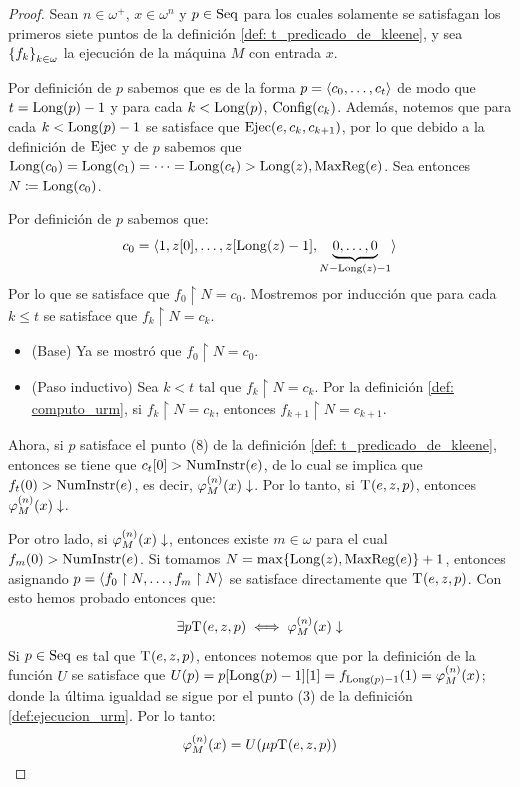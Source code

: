 \begin{proof}
	Sean $n\in\omega^{+}$, $x\in\omega^{n}$ y $p\in\SECUENCIAS$ para los cuales solamente se satisfagan los primeros siete puntos de la definición \ref{def: t_predicado_de_kleene}, y sea $\set*{f_{k}}_{k\in\omega}$ la ejecución de la máquina $M$ con entrada $x$.

	Por definición de $p$ sabemos que es de la forma $p =\inner*{c_{0},\dotsc, c_{t}}$ de modo que $t =\LONGITUD\pa*{p} - 1$ y para cada $k <\LONGITUD\pa*{p}$, $\CONFIGURACIONES\pa*{c_{k}}$. Además, notemos que para cada $k <\LONGITUD\pa*{p} - 1$ se satisface que $\EJECUCION\pa*{e, c_{k}, c_{k + 1}}$, por lo que debido a la definición de $\EJECUCION$ y de $p$ sabemos que $\LONGITUD\pa*{c_{0}} =\LONGITUD\pa*{c_{1}} =\dotsb =\LONGITUD\pa*{c_{t}} >\LONGITUD\pa*{z},\MAXREGISTRO\pa*{e}$. Sea entonces $N\coloneqq\LONGITUD\pa*{c_{0}}$.

	Por definición de $p$ sabemos que:
	\[
		c_{0} =\langle 1, z\bra*{0},\dotsc, z\bra*{\LONGITUD\pa*{z} - 1},\underbrace{0,\dotsc, 0}_{N -\LONGITUD\pa*{z} - 1}\rangle
	\]
	Por lo que se satisface que $f_{0}\upharpoonright N = c_{0}$. Mostremos por inducción que para cada $k\leq t$ se satisface que $f_{k}\upharpoonright N = c_{k}$.

	\begin{itemize}
		\item (Base) Ya se mostró que $f_{0}\upharpoonright N = c_{0}$.
		\item (Paso inductivo) Sea $k < t$ tal que $f_{k}\upharpoonright N = c_{k}$. Por la definición \ref{def: computo_urm}, si $f_{k}\upharpoonright N = c_{k}$, entonces $f_{k + 1}\upharpoonright N = c_{k + 1}$.
	\end{itemize}

	Ahora, si $p$ satisface el punto (8) de la definición \ref{def: t_predicado_de_kleene}, entonces se tiene que $c_{t}\bra*{0} >\NUMINSTRUCCIONES\pa*{e}$, de lo cual se implica que $f_{t}\pa*{0} >\NUMINSTRUCCIONES\pa*{e}$, es decir, $\PHI{M}[n]\pa*{x}\ACABA$. Por lo tanto, si $\KLEENE\pa*{e, z, p}$, entonces $\PHI{M}[n]\pa*{x}\ACABA$.

	Por otro lado, si $\PHI{M}[n]\pa*{x}\ACABA$, entonces existe $m\in\omega$ para el cual $f_{m}\pa*{0} >\NUMINSTRUCCIONES\pa*{e}$. Si tomamos $N =\max\set*{\LONGITUD\pa*{z},\MAXREGISTRO\pa*{e}} + 1$, entonces asignando $p =\inner*{f_{0}\upharpoonright N,\dotsc, f_{m}\upharpoonright N}$ se satisface directamente que $\KLEENE\pa*{e, z, p}$. Con esto hemos probado entonces que:
	\[
		\exists p \KLEENE\pa*{e, z, p}\iff\PHI{M}[n]\pa*{x}\ACABA
	\]
	Si $p\in\SECUENCIAS$ es tal que $\KLEENE\pa*{e, z, p}$, entonces notemos que por la definición de la función $U$ se satisface que $U\pa*{p} = p\bra*{\LONGITUD\pa*{p} - 1}\bra*{1} = f_{\LONGITUD\pa*{p} - 1}\pa*{1} =\PHI{M}[n]\pa*{x}$; donde la última igualdad se sigue por el punto (3) de la definición \ref{def:ejecucion_urm}. Por lo tanto:
	\[
		\PHI{M}[n]\pa*{x} = U\pa*{\mu p \KLEENE\pa*{e, z, p}}
	\]
\end{proof}

